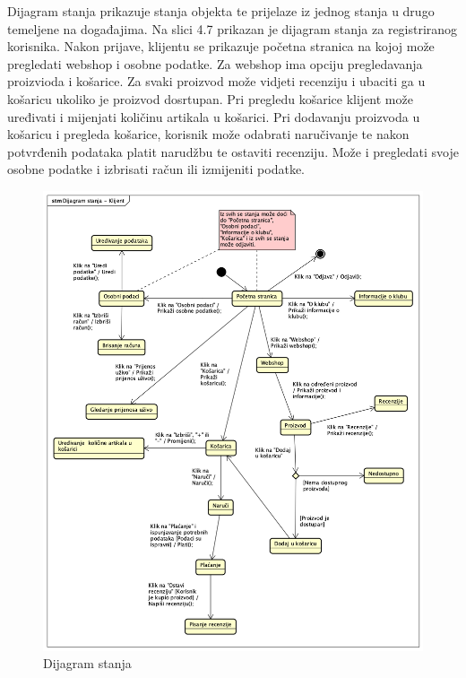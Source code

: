 			\textnormal{Dijagram stanja prikazuje stanja objekta te prijelaze iz jednog stanja u drugo temeljene na događajima. Na slici 4.7 prikazan je dijagram stanja za registriranog korisnika. Nakon prijave, klijentu se prikazuje početna stranica na kojoj može pregledati webshop i osobne podatke. Za  webshop ima opciju pregledavanja proizvioda i košarice. Za svaki proizvod može vidjeti recenziju i ubaciti ga u košaricu ukoliko je proizvod dosrtupan. Pri pregledu košarice klijent može  uređivati i mijenjati količinu artikala u košarici. Pri dodavanju proizvoda u košaricu i pregleda košarice, korisnik može odabrati naručivanje te nakon potvrđenih podataka platit narudžbu te ostaviti recenziju. Može i pregledati svoje osobne podatke i izbrisati račun ili izmijeniti podatke.}
			
			\begin{figure}[H]
				\includegraphics[width=\linewidth]{dijagrami/Dijagram_stanja.png}
				\centering
				\caption{Dijagram stanja }
				\label{fig:ClassDiagram1}
			\end{figure}
			
			
		
